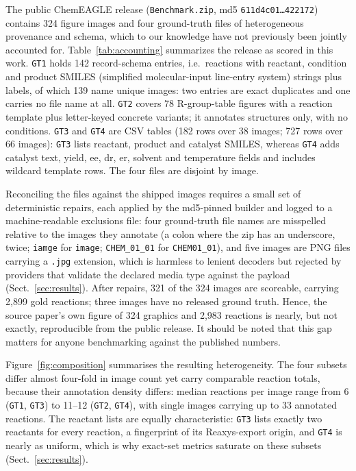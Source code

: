 \documentclass{article}
\begin{document}
The public ChemEAGLE release (\texttt{Benchmark.zip}, md5
\texttt{611d4c01\ldots{}422172}) contains 324 figure images and four
ground-truth files of heterogeneous provenance and schema, which to our
knowledge have not previously been jointly accounted for.
Table~\ref{tab:accounting} summarizes the release as scored in this
work. \texttt{GT1} holds 142 record-schema entries, i.e.\ reactions
with reactant, condition and product SMILES (simplified
molecular-input line-entry system) strings plus labels, of which 139
name unique images: two entries are exact duplicates and one carries no
file name at all. \texttt{GT2} covers 78 R-group-table figures with a
reaction template plus letter-keyed concrete variants; it annotates
structures only, with no conditions. \texttt{GT3} and \texttt{GT4} are
CSV tables (182 rows over 38 images; 727 rows over 66 images):
\texttt{GT3} lists reactant, product and catalyst SMILES, whereas
\texttt{GT4} adds catalyst text, yield, ee, dr, er, solvent and
temperature fields and includes wildcard template rows. The four files
are disjoint by image.

Reconciling the files against the shipped images requires a small set
of deterministic repairs, each applied by the md5-pinned builder and
logged to a machine-readable exclusions file: four ground-truth file
names are misspelled relative to the images they annotate (a colon
where the zip has an underscore, twice; \texttt{iamge} for
\texttt{image}; \texttt{CHEM\_01\_01} for \texttt{CHEM01\_01}), and five
images are PNG files carrying a \texttt{.jpg} extension, which is
harmless to lenient decoders but rejected by providers that validate
the declared media type against the payload
(Sect.~\ref{sec:results}). After repairs, 321 of the 324 images are
scoreable, carrying 2{,}899 gold reactions; three images have no
released ground truth. Hence, the source paper's own figure of 324
graphics and 2{,}983 reactions is nearly, but not exactly,
reproducible from the public release. It should be noted that this gap
matters for anyone benchmarking against the published numbers.

Figure~\ref{fig:composition} summarises the resulting heterogeneity.
The four subsets differ almost four-fold in image count yet carry
comparable reaction totals, because their annotation density differs:
median reactions per image range from 6 (\texttt{GT1}, \texttt{GT3})
to 11--12 (\texttt{GT2}, \texttt{GT4}), with single images carrying up
to 33 annotated reactions. The reactant lists are equally
characteristic: \texttt{GT3} lists exactly two reactants for every
reaction, a fingerprint of its Reaxys-export origin, and \texttt{GT4}
is nearly as uniform, which is why exact-set metrics saturate on these
subsets (Sect.~\ref{sec:results}).
\end{document}
